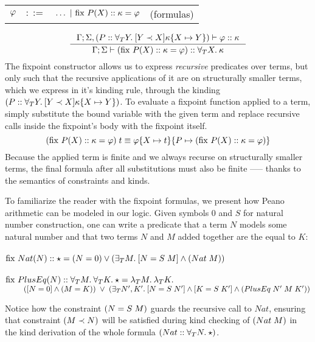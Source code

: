 \documentclass[english, mgr]{iithesis}
\renewcommand{\it}[1]{\textit{#1}}
\begin{document}
\begin{tabular}{rrlr}
$\varphi$ & $::=$ & $\ldots
               \ |\  \text{fix }P(X)::\kappa={\varphi} $
    & (formulas)
\end{tabular}
$$
\inference{
  \cEnv;\kEnv, (\propv \ofkind \kForallTerm{Y} \kGuard{Y \cshlt \termv}{\kind\subst{\termv}{Y}})\vdash \formphi \ofkind \kind
}{
  \cEnv;\kEnv\vdash (\fix{\propv}{\termv}{\kind}{\formphi}) \ofkind \kForallTerm{\termv}{\kind}
}
$$
The fixpoint constructor allows us to express \it{recursive} predicates over terms,
but only such that the recursive applications of it are on structurally smaller terms,
which we express in it's kinding rule, through the kinding $(P :: \forall_T Y .\: [Y \prec X]{\kappa\{X\mapsto Y\}})$.
To evaluate a fixpoint function applied to a term, simply substitute the bound
variable with the given term and replace recursive calls inside the fixpoint's body with the fixpoint itself.
$$
(\text{fix }P(X)::\kappa={\varphi})\;t
\equiv
\varphi\{X\mapsto t\}\{P\mapsto(\text{fix }P(X)::\kappa={\varphi})\}
$$
Because the applied term is finite
and we always recurse on structurally smaller terms,
the final formula after all substitutions must also be finite
--— thanks to the semantics of constraints and kinds.

To familiarize the reader with the fixpoint formulas,
we present how Peano arithmetic can be modeled in our logic.
Given symbols $0$ and $S$ for natural number construction,
one can write a predicate that a term $N$ models some natural number
and that two terms $N$ and $M$ added together are the equal to $K$:\\ \\
$
\text{fix }Nat(N)::\star={(N = 0) \vee (\exists_T M .\: [N = {S \; M}]\wedge ({Nat}\;M))}
$
\\ \\
$\text{fix }PlusEq(N)::\forall_T M .\:\forall_T K .\:\star={\lambda_T M .\:\lambda_T K .\:}$ \\
$\text{ }\qquad
  ([N = 0]\wedge{(M =K)}) \;\vee\;
   (\exists_T N', K' .\:[N = {S \; N'}]\wedge[K = {S \; K'}]\wedge{({PlusEq}\;{N'}\;{M}\;{K'})}
   )
$

Notice how the constraint $(N = {S \; M})$ guards the recursive call to $Nat$,
ensuring that constraint $(M \prec N)$ will be satisfied during kind checking of
$({{Nat}\;M})$ in the kind derivation of the whole formula
$({Nat} :: \forall_T N .\:{\star})$.
\end{document}
